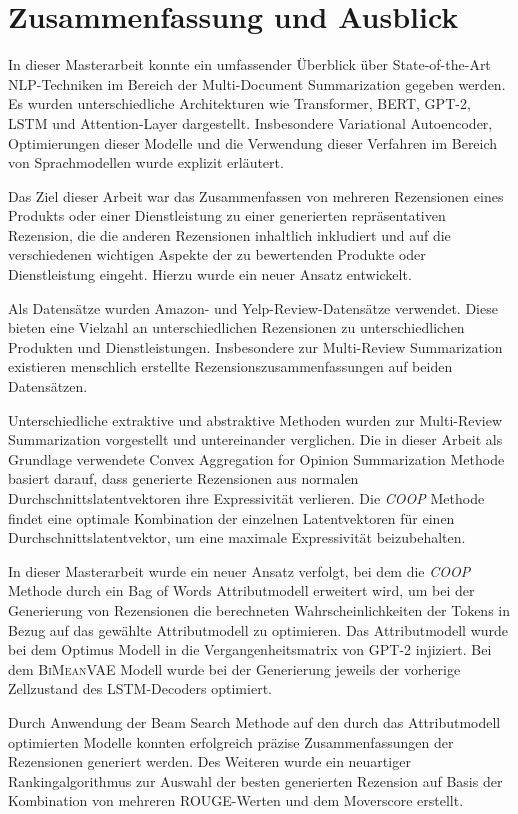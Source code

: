 \section{Zusammenfassung und Ausblick}\raggedbottom
\label{summary}
In dieser Masterarbeit konnte ein umfassender Überblick über State-of-the-Art NLP-Techniken im Bereich der Multi-Document Summarization gegeben werden.
Es wurden unterschiedliche Architekturen wie Transformer, BERT, GPT-2, LSTM und Attention-Layer dargestellt. 
Insbesondere Variational Autoencoder, Optimierungen dieser Modelle und die Verwendung dieser Verfahren im Bereich von Sprachmodellen wurde explizit erläutert.

Das Ziel dieser Arbeit war das Zusammenfassen von mehreren Rezensionen eines Produkts oder einer Dienstleistung zu einer generierten repräsentativen Rezension, die die anderen Rezensionen inhaltlich inkludiert und auf die verschiedenen wichtigen Aspekte der zu bewertenden Produkte oder Dienstleistung eingeht.
Hierzu wurde ein neuer Ansatz entwickelt.

Als Datensätze wurden Amazon- und Yelp-Review-Datensätze verwendet. Diese bieten eine Vielzahl an unterschiedlichen Rezensionen zu unterschiedlichen Produkten und Dienstleistungen. Insbesondere zur Multi-Review Summarization existieren menschlich erstellte Rezensionszusammenfassungen auf beiden Datensätzen.

Unterschiedliche extraktive und abstraktive Methoden wurden zur Multi-Review Summarization vorgestellt und untereinander verglichen. 
Die in dieser Arbeit als Grundlage verwendete Convex Aggregation for Opinion Summarization Methode basiert darauf, dass generierte Rezensionen aus normalen Durchschnittslatentvektoren ihre Expressivität verlieren. 
Die \textit{COOP} Methode findet eine optimale Kombination der einzelnen Latentvektoren für einen Durchschnittslatentvektor, um eine maximale Expressivität beizubehalten.

In dieser Masterarbeit wurde ein neuer Ansatz verfolgt, bei dem die \textit{COOP} Methode durch ein Bag of Words Attributmodell erweitert wird, um bei der Generierung von Rezensionen die berechneten Wahrscheinlichkeiten der Tokens in Bezug auf das gewählte Attributmodell zu optimieren.
Das Attributmodell wurde bei dem Optimus Modell in die Vergangenheitsmatrix von GPT-2 injiziert. Bei dem \textsc{BiMeanVAE} Modell wurde bei der Generierung jeweils der vorherige Zellzustand des LSTM-Decoders optimiert.

Durch Anwendung der Beam Search Methode auf den durch das Attributmodell optimierten Modelle konnten erfolgreich präzise Zusammenfassungen der Rezensionen generiert werden.
Des Weiteren wurde ein neuartiger Rankingalgorithmus zur Auswahl der besten generierten Rezension auf Basis der Kombination von mehreren ROUGE-Werten und dem Moverscore erstellt.


